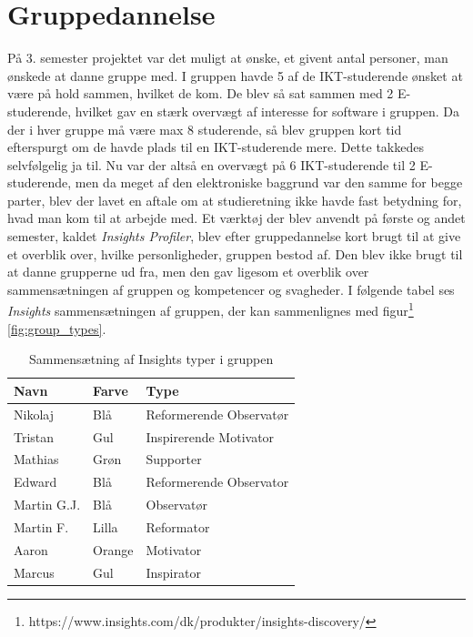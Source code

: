 \documentclass[a4paper,12pt,fleqn,oneside]{article}
\begin{document}
\section{Gruppedannelse}
På 3. semester projektet var det muligt at ønske, et givent antal personer, man ønskede at danne gruppe med. I gruppen havde 5 af de IKT-studerende ønsket at være på hold sammen, hvilket de kom. De blev så sat sammen med 2 E-studerende, hvilket gav en stærk overvægt af interesse for software i gruppen. Da der i hver gruppe må være max 8 studerende, så blev gruppen kort tid efterspurgt om de havde plads til en IKT-studerende mere. Dette takkedes selvfølgelig ja til. Nu var der altså en overvægt på 6 IKT-studerende til 2 E-studerende, men da meget af den elektroniske baggrund var  den samme for begge parter, blev der lavet en aftale om at studieretning ikke havde fast betydning for, hvad man kom til at arbejde med. Et værktøj der blev anvendt på første og andet semester, kaldet \textit{Insights Profiler}, blev efter gruppedannelse kort brugt til at give et overblik over, hvilke personligheder, gruppen bestod af. Den blev ikke brugt til at danne grupperne ud fra, men den gav ligesom et overblik over sammensætningen af gruppen og kompetencer og svagheder. I
følgende tabel ses \textit{Insights} sammensætningen af gruppen, der kan sammenlignes med figur\footnote{https://www.insights.com/dk/produkter/insights-discovery/} \ref{fig:group_types}.
\begin{table}[H]
\centering
\begin{tabular}{|L{0.2\textwidth}|L{0.2\textwidth}|L{0.4\textwidth}|}
\hline
\textbf{Navn} & \textbf{Farve} & \textbf{Type} \\ \hline
Nikolaj & Blå & Reformerende Observatør  \\ \hline
Tristan & Gul & Inspirerende Motivator\\ \hline
Mathias & Grøn & Supporter \\ \hline
Edward & Blå & Reformerende Observator \\ \hline
Martin G.J. & Blå  & Observatør \\ \hline
Martin F. & Lilla & Reformator  \\ \hline
Aaron & Orange & Motivator \\ \hline
Marcus & Gul & Inspirator \\ \hline
\end{tabular}
\caption{Sammensætning af Insights typer i gruppen}
\label{table_group_types}
\end{table}
\end{document}
